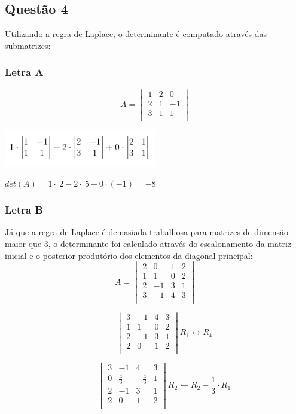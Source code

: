 \documentclass[a4paper, 11pt]{article}
\begin{document}
\subsection*{Questão 4}
Utilizando a regra de Laplace, o determinante é computado através das submatrizes:
\subsubsection*{Letra A}
$$
A = \begin{vmatrix}
1 & 2  & 0 \\ 
2 & 1 & -1 \\ 
3 & 1 & 1 \\
\end{vmatrix}
$$
\begin{center}
\includegraphics[width=0.5\textwidth]{q4a1.png}
\end{center}

\begin{center}
$det(A) = 1\cdot \:2-2\cdot \:5+0\cdot \left(-1\right)=-8$
\end{center}


\subsubsection*{Letra B}
Já que a regra de Laplace é demasiada trabalhosa para matrizes de dimensão maior que 3, o determinante foi calculado através do escalonamento da matriz inicial e o posterior produtório dos elementos
da diagonal principal:
$$
A = \begin{vmatrix}
2 & 0 & 1 & 2 \\ 
1 & 1 & 0 & 2 \\ 
2 & -1 & 3 & 1 \\
3 & -1 & 4 & 3 \\
\end{vmatrix}
$$


$$
\phantom{A = }
\begin{vmatrix}
3 & -1 & 4 & 3 \\ 
1 & 1 & 0 & 2 \\ 
2 & -1 & 3 & 1 \\
2 & 0 & 1 & 2 \\ 
\end{vmatrix}
R_1 \leftrightarrow R_4
$$

$$
\phantom{A = }
\begin{vmatrix}
3 & -1 & 4 & 3 \\ 
0 & \frac{4}{3} & -\frac{4}{3} & 1 \\ 
2 & -1 & 3 & 1 \\
2 & 0 & 1 & 2 \\ 
\end{vmatrix}
R_2 \leftarrow R_2-\frac{1}{3} \cdot R_1
$$
\end{document}
